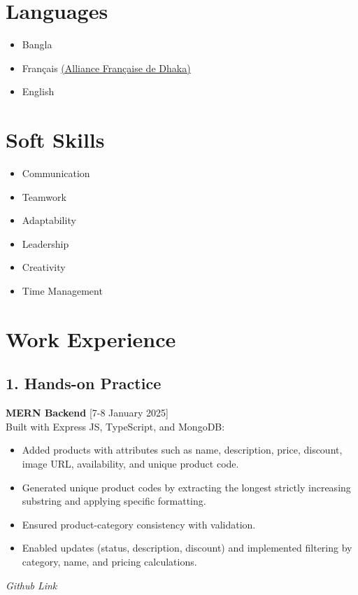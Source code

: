 \documentclass[a4paper,10pt]{article}
\begin{document}
\begin{paracol}{2}
\section*{Languages}
\begin{itemize}
    \item Bangla
    \item Français \href{https://www.afdhaka.org/}{(Alliance Française de Dhaka)}
    \item English
\end{itemize}

\section*{Soft Skills}
\begin{itemize}
    \item Communication
    \item Teamwork
    \item Adaptability
    \item Leadership
    \item Creativity
    \item Time Management
\end{itemize}

\switchcolumn

\section*{Work Experience}
\subsection*{1. Hands-on Practice} 
\textbf{MERN Backend} [7-8 January 2025] \\
Built with Express JS, TypeScript, and MongoDB:
\begin{itemize}
    \item Added products with attributes such as name, description, price, discount, image URL, availability, and unique product code.
    \item Generated unique product codes by extracting the longest strictly increasing substring and applying specific formatting.
    \item Ensured product-category consistency with validation.
    \item Enabled updates (status, description, discount) and implemented filtering by category, name, and pricing calculations.
\end{itemize}
\textit{Github Link}


\end{paracol}
\end{document}

